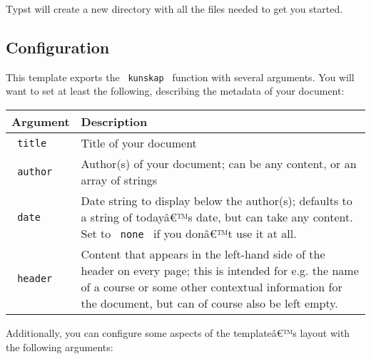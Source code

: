 Typst will create a new directory with all the files needed to get you
started.

\subsection{Configuration}\label{configuration}

This template exports the \texttt{\ kunskap\ } function with several
arguments. You will want to set at least the following, describing the
metadata of your document:

\begin{longtable}[]{@{}ll@{}}
\toprule\noalign{}
Argument & Description \\
\midrule\noalign{}
\endhead
\bottomrule\noalign{}
\endlastfoot
\texttt{\ title\ } & Title of your document \\
\texttt{\ author\ } & Author(s) of your document; can be any content, or
an array of strings \\
\texttt{\ date\ } & Date string to display below the author(s); defaults
to a string of todayâ€™s date, but can take any content. Set to
\texttt{\ none\ } if you donâ€™t use it at all. \\
\texttt{\ header\ } & Content that appears in the left-hand side of the
header on every page; this is intended for e.g. the name of a course or
some other contextual information for the document, but can of course
also be left empty. \\
\end{longtable}

Additionally, you can configure some aspects of the templateâ€™s layout
with the following arguments:

